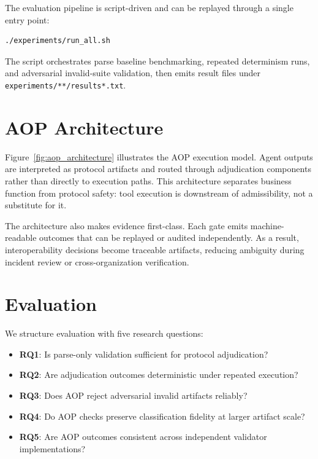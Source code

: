 \documentclass[10pt,conference]{IEEEtran}
\begin{document}
The evaluation pipeline is script-driven and can be replayed through a single
entry point:

\begin{verbatim}
./experiments/run_all.sh
\end{verbatim}

The script orchestrates parse baseline benchmarking, repeated determinism runs,
and adversarial invalid-suite validation, then emits result files under
\texttt{experiments/**/results*.txt}.

\section{AOP Architecture}



Figure~\ref{fig:aop_architecture} illustrates the AOP execution model. Agent
outputs are interpreted as protocol artifacts and routed through adjudication
components rather than directly to execution paths. This architecture separates
business function from protocol safety: tool execution is downstream of
admissibility, not a substitute for it.

The architecture also makes evidence first-class. Each gate emits
machine-readable outcomes that can be replayed or audited independently.
As a result, interoperability decisions become traceable artifacts, reducing
ambiguity during incident review or cross-organization verification.

\section{Evaluation}

We structure evaluation with five research questions:
\begin{itemize}
\item \textbf{RQ1}: Is parse-only validation sufficient for protocol
      adjudication?
\item \textbf{RQ2}: Are adjudication outcomes deterministic under repeated
      execution?
\item \textbf{RQ3}: Does AOP reject adversarial invalid artifacts reliably?
\item \textbf{RQ4}: Do AOP checks preserve classification fidelity at larger
      artifact scale?
\item \textbf{RQ5}: Are AOP outcomes consistent across independent validator
      implementations?
\end{itemize}
\end{document}
